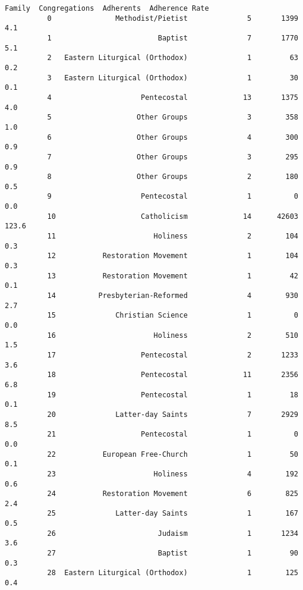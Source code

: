\documentclass[11pt]{article}
\begin{document}
\begin{Verbatim}[commandchars=\\\{\}]
                                     Family  Congregations  Adherents  Adherence Rate  
          0               Methodist/Pietist              5       1399             4.1  
          1                         Baptist              7       1770             5.1  
          2   Eastern Liturgical (Orthodox)              1         63             0.2  
          3   Eastern Liturgical (Orthodox)              1         30             0.1  
          4                     Pentecostal             13       1375             4.0  
          5                    Other Groups              3        358             1.0  
          6                    Other Groups              4        300             0.9  
          7                    Other Groups              3        295             0.9  
          8                    Other Groups              2        180             0.5  
          9                     Pentecostal              1          0             0.0  
          10                    Catholicism             14      42603           123.6  
          11                       Holiness              2        104             0.3  
          12           Restoration Movement              1        104             0.3  
          13           Restoration Movement              1         42             0.1  
          14          Presbyterian-Reformed              4        930             2.7  
          15              Christian Science              1          0             0.0  
          16                       Holiness              2        510             1.5  
          17                    Pentecostal              2       1233             3.6  
          18                    Pentecostal             11       2356             6.8  
          19                    Pentecostal              1         18             0.1  
          20              Latter-day Saints              7       2929             8.5  
          21                    Pentecostal              1          0             0.0  
          22           European Free-Church              1         50             0.1  
          23                       Holiness              4        192             0.6  
          24           Restoration Movement              6        825             2.4  
          25              Latter-day Saints              1        167             0.5  
          26                        Judaism              1       1234             3.6  
          27                        Baptist              1         90             0.3  
          28  Eastern Liturgical (Orthodox)              1        125             0.4  

\end{Verbatim}
\end{document}
